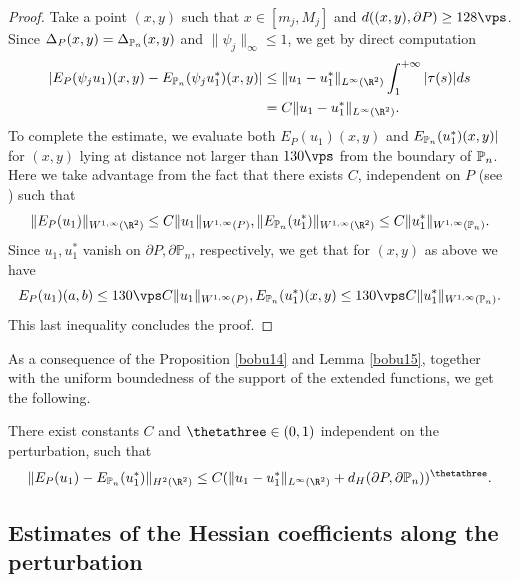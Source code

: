 \begin{proof}
Take a point $(x,y)$ such that $x \in [m_j, M_j]$ and $d((x,y), \partial P) \ge 128 \vps$. Since $\Delta_P(x,y) =\Delta_{\Bbb P_n}(x,y)$ and $\|\psi_j\|_\infty \le 1$, we get by direct computation
\begin{align*}
|E_P(\psi_j u_1)(x,y)-E_{\Bbb P_n}(\psi_j u^*_1)(x,y)|&\le \|u_1-u_1^*\|_{L^\infty(\R^2)}\int_1^{+\infty}|\tau(s) | ds \\
&= C \|u_1-u_1^*\|_{L^\infty(\R^2)}.
\end{align*}
To complete the estimate, we evaluate both $E_P(u_1)(x,y)$ and $E_{\Bbb P_n}(u^*_1)(x,y)|$ for $(x,y)$ lying at distance not larger than $130 \vps$ from the boundary of $\Bbb P_n$. Here we take advantage from the fact that there exists $C$, independent on $P$ (see \cite[Th.\,5, p.\,181]{St70}) such that
\[
\|E_P(u_1)\|_{W^{1, \infty} (\R^2)} \le C \|u_1\|_{W^{1, \infty} (P)}, \|E_ {\Bbb P_n}(u_1^*)\|_{W^{1, \infty} (\R^2)} \le C \|u_1^*\|_{W^{1, \infty} (\Bbb P_n)}.
\]
Since $u_1, u_1^*$ vanish on $\partial P, \partial \mathbb P_n$, respectively, we get that for $(x,y)$ as above we have
\[
E_P(u_1)(a,b) \le 130 \vps C \|u_1\|_{W^{1, \infty} (P)}, E_ {\Bbb P_n}(u_1^*)(x,y) \le 130 \vps C \|u_1^*\|_{W^{1, \infty} (\Bbb P_n)}.
\]
This last inequality concludes the proof.
\end{proof}
As a consequence of the Proposition \ref{bobu14} and Lemma \ref{bobu15}, together with the uniform boundedness of the support of the extended functions, we get the following.
\begin{cor}
There exist constants $C$ and $\thetathree \in (0, 1)$ independent on the perturbation, such that
\[
\|E_P(u_1)-E_{\Bbb P_n}(u_1^*)\|_{H^{2} (\R^2)}\le C (\|u_1-u_1^*\|_{L^\infty(\R^2)}+d_H(\partial P, \partial \Bbb P_n))^\thetathree.
\]
\end{cor}

\subsection{Estimates of the Hessian coefficients along the perturbation}

